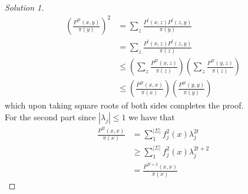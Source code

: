 \documentclass[a4paper]{article}
\begin{document}
\begin{proof}[Solution 1]
	\begin{align*}
    \left( \frac{P^{2t}(x, y)}{\pi (y)} \right)^2 &= \sum_{z} \frac{P^t(x,z)P^t(z,y)}{\pi(y)}\\
                                                  &= \sum_{z}\frac{P^t(x,z)P^t(z,y)}{\pi(z)}\\
                                                  &\leq \left( \sum_{z} \frac{P^{2t}(x,z)}{\pi(z)} \right) \left( \sum_{z} \frac{P^{2t}(y,z)}{\pi(z)} \right)\\
                                                  &\leq \left( \frac{P^{2t}(x,x)}{\pi(x)} \right) \left( \frac{P^{2t}(y,y)}{\pi(y)} \right)
	\end{align*}
	which upon taking square roots of both sides completes the proof.\\
	For the second part since $|\lambda_j| \leq 1$ we have that
	\begin{align*}
    \frac{P^{2t}(x,x)}{\pi (x)} &= \sum_{1}^{|\Sigma|} f_{j}^2 (x) \lambda_j^{2t}\\
                                &\geq \sum_{1}^{|\Sigma|} f_{j}^2 (x) \lambda_j^{2t+2}\\
                                &= \frac{P^{2t+2}(x,x)}{\pi (x)}
	\end{align*}
\end{proof}
\end{document}
